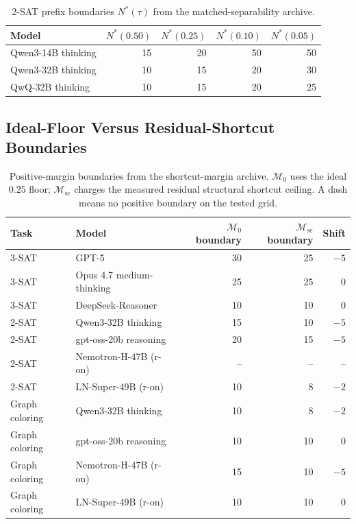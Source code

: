 \documentclass[acmsmall,screen,review,anonymous]{acmart}
\providecommand{\MarginZero}{\mathcal{M}_{0}}
\providecommand{\MarginShortcut}{\mathcal{M}_{\mathrm{sc}}}
\begin{document}
\begin{table}[t]
\centering
\caption{2-SAT prefix boundaries \(N^*(\tau)\) from the
matched-separability archive.}
\label{tab:supp-threshold-2sat}
\renewcommand{\arraystretch}{1.08}
\begin{tabular}{lrrrr}
\toprule
Model & \(N^*(0.50)\) & \(N^*(0.25)\) & \(N^*(0.10)\) & \(N^*(0.05)\)\\
\midrule
Qwen3-14B thinking & 15 & 20 & 50 & 50\\
Qwen3-32B thinking & 10 & 15 & 20 & 30\\
QwQ-32B thinking & 10 & 15 & 20 & 25\\
\bottomrule
\end{tabular}
\end{table}

\subsection{Ideal-Floor Versus Residual-Shortcut Boundaries}

\begin{table}[t]
\centering
\caption{Positive-margin boundaries from the shortcut-margin archive.
\(\MarginZero\) uses the ideal \(0.25\) floor; \(\MarginShortcut\) charges the measured
residual structural shortcut ceiling. A dash means no positive boundary on
the tested grid.}
\label{tab:supp-rmc-boundaries}
\renewcommand{\arraystretch}{1.08}
\begin{tabular}{llrrr}
\toprule
Task & Model & \(\MarginZero\) boundary & \(\MarginShortcut\) boundary & Shift\\
\midrule
3-SAT & GPT-5 & 30 & 25 & \(-5\)\\
3-SAT & Opus 4.7 medium-thinking & 25 & 25 & \(0\)\\
3-SAT & DeepSeek-Reasoner & 10 & 10 & \(0\)\\
\midrule
2-SAT & Qwen3-32B thinking & 15 & 10 & \(-5\)\\
2-SAT & gpt-oss-20b reasoning & 20 & 15 & \(-5\)\\
2-SAT & Nemotron-H-47B (r-on) & -- & -- & --\\
2-SAT & LN-Super-49B (r-on) & 10 & 8 & \(-2\)\\
\midrule
Graph coloring & Qwen3-32B thinking & 10 & 8 & \(-2\)\\
Graph coloring & gpt-oss-20b reasoning & 10 & 10 & \(0\)\\
Graph coloring & Nemotron-H-47B (r-on) & 15 & 10 & \(-5\)\\
Graph coloring & LN-Super-49B (r-on) & 10 & 10 & \(0\)\\
\bottomrule
\end{tabular}
\end{table}
\end{document}
